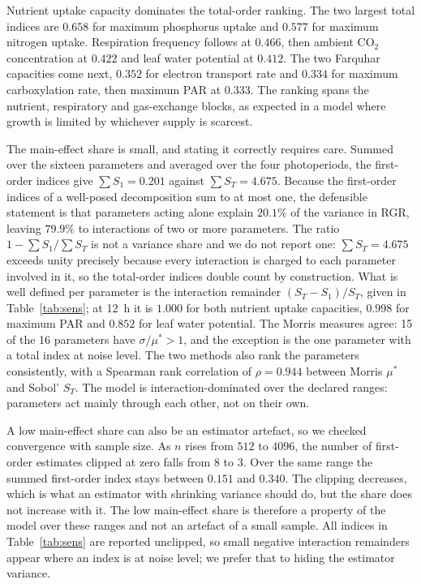 Nutrient uptake capacity dominates the total-order ranking. The two largest
total indices are $0.658$ for maximum phosphorus uptake and $0.577$ for maximum
nitrogen uptake. Respiration frequency follows at $0.466$, then ambient CO$_2$
concentration at $0.422$ and leaf water potential at $0.412$. The two Farquhar
capacities come next, $0.352$ for electron transport rate and $0.334$ for
maximum carboxylation rate, then maximum PAR at $0.333$. The ranking spans the
nutrient, respiratory and gas-exchange blocks, as expected in a model where
growth is limited by whichever supply is scarcest.

The main-effect share is small, and stating it correctly requires care. Summed
over the sixteen parameters and averaged over the four photoperiods, the
first-order indices give $\sum S_1 = 0.201$ against $\sum S_T = 4.675$. Because
the first-order indices of a well-posed decomposition sum to at most one, the
defensible statement is that parameters acting alone explain $20.1\%$ of the
variance in RGR, leaving $79.9\%$ to interactions of two or more parameters. The
ratio $1 - \sum S_1 / \sum S_T$ is not a variance share and we do not report one:
$\sum S_T = 4.675$ exceeds unity precisely because every interaction is charged
to each parameter involved in it, so the total-order indices double count by
construction. What is well defined per parameter is the interaction remainder
$(S_T - S_1)/S_T$, given in Table~\ref{tab:sens}; at 12~h it is $1.000$ for both
nutrient uptake capacities, $0.998$ for maximum PAR and $0.852$ for leaf water
potential. The
Morris measures agree: 15 of the 16 parameters have $\sigma/\mu^{*} > 1$, and
the exception is the one parameter with a total index at noise level. The two
methods also rank the parameters consistently, with a Spearman rank correlation
of $\rho = 0.944$ between Morris $\mu^{*}$ and Sobol' $S_T$. The model is
interaction-dominated over the declared ranges: parameters act mainly through
each other, not on their own.

A low main-effect share can also be an estimator artefact, so we checked
convergence with sample size. As $n$ rises from $512$ to $4096$, the number of
first-order estimates clipped at zero falls from $8$ to $3$. Over the same
range the summed first-order index stays between $0.151$ and $0.340$. The
clipping decreases, which is what an
estimator with shrinking variance should do, but the share does not increase
with it. The low main-effect share is therefore a property of the model over
these ranges and not an artefact of a small sample. All indices in
Table~\ref{tab:sens} are reported unclipped, so small negative interaction
remainders appear where an index is at noise level; we prefer that to hiding
the estimator variance.


